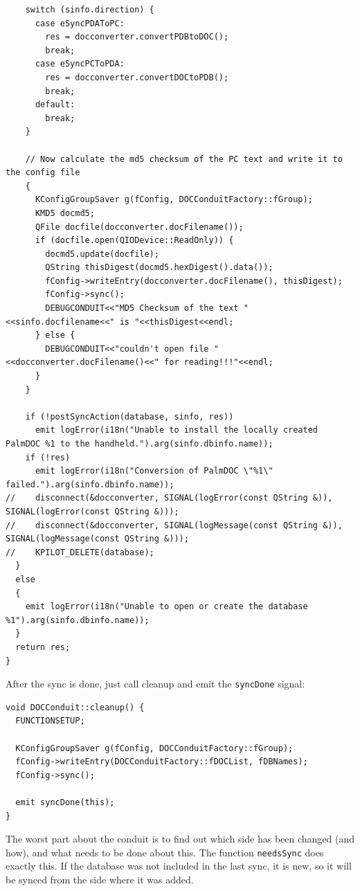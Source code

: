 \documentclass[10pt,a4paper]{article}
\newcommand{\code}[1]{{\small\texttt{#1}}}
\begin{document}
{\begin{verbatim}
    switch (sinfo.direction) {
      case eSyncPDAToPC:
        res = docconverter.convertPDBtoDOC();
        break;
      case eSyncPCToPDA:
        res = docconverter.convertDOCtoPDB();
        break;
      default:
        break;
    }
    
    // Now calculate the md5 checksum of the PC text and write it to the config file
    {
      KConfigGroupSaver g(fConfig, DOCConduitFactory::fGroup);
      KMD5 docmd5;
      QFile docfile(docconverter.docFilename());
      if (docfile.open(QIODevice::ReadOnly)) {
        docmd5.update(docfile);
        QString thisDigest(docmd5.hexDigest().data());
        fConfig->writeEntry(docconverter.docFilename(), thisDigest);
        fConfig->sync();
        DEBUGCONDUIT<<"MD5 Checksum of the text "<<sinfo.docfilename<<" is "<<thisDigest<<endl;
      } else {
        DEBUGCONDUIT<<"couldn't open file "<<docconverter.docFilename()<<" for reading!!!"<<endl;
      }
    }
    
    if (!postSyncAction(database, sinfo, res)) 
      emit logError(i18n("Unable to install the locally created PalmDOC %1 to the handheld.").arg(sinfo.dbinfo.name));
    if (!res)
      emit logError(i18n("Conversion of PalmDOC \"%1\" failed.").arg(sinfo.dbinfo.name));
//    disconnect(&docconverter, SIGNAL(logError(const QString &)), SIGNAL(logError(const QString &)));
//    disconnect(&docconverter, SIGNAL(logMessage(const QString &)), SIGNAL(logMessage(const QString &)));
//    KPILOT_DELETE(database);
  }
  else
  {
    emit logError(i18n("Unable to open or create the database %1").arg(sinfo.dbinfo.name));
  }
  return res;
}

\end{verbatim}
}


After the sync is done, just call cleanup and emit the \code{syncDone} signal:

{\footnotesize
\begin{verbatim}
void DOCConduit::cleanup() {
  FUNCTIONSETUP;
  
  KConfigGroupSaver g(fConfig, DOCConduitFactory::fGroup);
  fConfig->writeEntry(DOCConduitFactory::fDOCList, fDBNames);
  fConfig->sync();

  emit syncDone(this);
}
\end{verbatim}
}



The worst part about the conduit is to find out which side has been changed (and how), and what needs to be done about this. The function \code{needsSync} does exactly this. If the database was not included in the last sync, it is new, so it will be synced from the side where it was added. 
\end{document}
